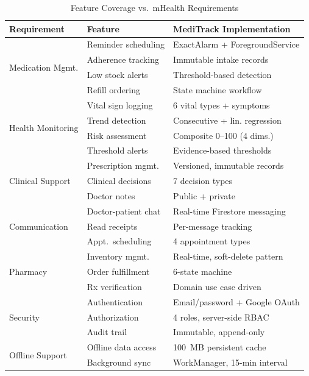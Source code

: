 \documentclass[journal,onecolumn,web]{ieeecolor}
\begin{document}
\begin{table}[!t]
\caption{Feature Coverage vs.\ mHealth Requirements}
\label{tab:coverage}
\centering\small
\begin{tabular}{p{3.2cm} l l}
\toprule
{\bf Requirement} & {\bf Feature}
& {\bf MediTrack Implementation} \\
\midrule
\multirow{4}{*}{Medication Mgmt.}
& Reminder scheduling
& ExactAlarm + ForegroundService \\
& Adherence tracking
& Immutable intake records \\
& Low stock alerts
& Threshold-based detection \\
& Refill ordering
& State machine workflow \\
\midrule
\multirow{4}{*}{Health Monitoring}
& Vital sign logging
& 6 vital types + symptoms \\
& Trend detection
& Consecutive + lin. regression \\
& Risk assessment
& Composite 0--100 (4 dims.) \\
& Threshold alerts
& Evidence-based thresholds \\
\midrule
\multirow{3}{*}{Clinical Support}
& Prescription mgmt.
& Versioned, immutable records \\
& Clinical decisions
& 7 decision types \\
& Doctor notes
& Public + private \\
\midrule
\multirow{3}{*}{Communication}
& Doctor-patient chat
& Real-time Firestore messaging \\
& Read receipts
& Per-message tracking \\
& Appt.\ scheduling
& 4 appointment types \\
\midrule
\multirow{3}{*}{Pharmacy}
& Inventory mgmt.
& Real-time, soft-delete pattern \\
& Order fulfillment
& 6-state machine \\
& Rx verification
& Domain use case driven \\
\midrule
\multirow{3}{*}{Security}
& Authentication
& Email/password + Google OAuth \\
& Authorization
& 4 roles, server-side RBAC \\
& Audit trail
& Immutable, append-only \\
\midrule
\multirow{2}{*}{Offline Support}
& Offline data access
& 100~MB persistent cache \\
& Background sync
& WorkManager, 15-min interval \\
\bottomrule
\end{tabular}
\end{table}
\end{document}
